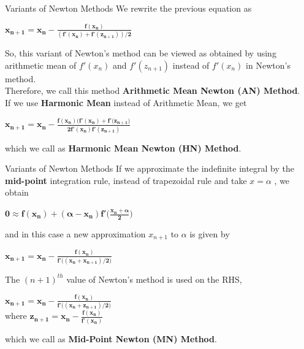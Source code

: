 \documentclass[10pt]{beamer}
\begin{document}
\begin{frame}[fragile]{Variants of Newton Methods}
 We rewrite the previous equation as
 \begin{center}
  $\boldsymbol{x_{n+1}=x_n-\frac{f(x_n)}{(f'(x_n)+f'(z_{n+1}))/2}}$    
 \end{center}
 So, this variant of Newton's method can be viewed as obtained by using arithmetic mean of $f'(x_n)$
and  $f'(z_{n+1})$ instead of $f'(x_n)$ in Newton's method.
\vspace{2mm}\ \\

Therefore, we call this method \textbf{Arithmetic Mean Newton (AN) Method}. 
\vspace{2mm}\ \\
If we use \textbf{Harmonic Mean} instead of Arithmetic Mean, we get 
\begin{center}
  $\boldsymbol{x_{n+1}=x_n-\frac{f(x_n)\big(f'(x_n)+f'(z_{n+1}\big)}{2f'(x_n)f'(z_{n+1})}}$    
 \end{center}
 which we call as \textbf{Harmonic Mean Newton (HN) Method}.
\end{frame}

\begin{frame}[fragile]{Variants of Newton Methods}
  If we approximate the indefinite integral by the \textbf{mid-point} integration rule, instead of trapezoidal rule and take $x=\alpha$ , we obtain
 \begin{center}
     $\boldsymbol{0 \approx f(x_n)+(\alpha-x_n)f'\big(\frac{x_n+\alpha}{2}\big)}$
 \end{center}
 and in this case a new approximation $x_{n+1}$ to $\alpha$ is given by 
 \begin{center}
     $\boldsymbol{x_{n+1}=x_n-\frac{f(x_n)}{f'\big((x_n+x_{n+1})/2\big)}}$
 \end{center}
 The $(n+1)^{th}$ value of Newton's method is used on the RHS,
 \begin{center}
     $\boldsymbol{x_{n+1}=x_n-\frac{f(x_n)}{f'\big((x_n+z_{n+1})/2\big)}}$
     \vspace{2mm}\ \\
     where $\boldsymbol{z_{n+1}=x_n-\frac{f(x_n)}{f'(x_n)}}$
 \end{center}
 which we call as \textbf{Mid-Point Newton (MN) Method}.
\end{frame}
\end{document}
